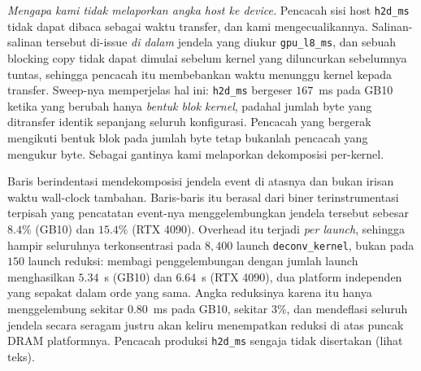 \documentclass[conference]{IEEEtran}
\begin{document}
\emph{Mengapa kami tidak melaporkan angka host ke device.} Pencacah sisi host \texttt{h2d\_ms} tidak dapat dibaca sebagai waktu transfer, dan kami mengecualikannya. Salinan-salinan tersebut di-issue \emph{di dalam} jendela yang diukur \texttt{gpu\_l8\_ms}, dan sebuah blocking copy tidak dapat dimulai sebelum kernel yang diluncurkan sebelumnya tuntas, sehingga pencacah itu membebankan waktu menunggu kernel kepada transfer. Sweep-nya memperjelas hal ini: \texttt{h2d\_ms} bergeser $167$~ms pada GB10 ketika yang berubah hanya \emph{bentuk blok kernel}, padahal jumlah byte yang ditransfer identik sepanjang seluruh konfigurasi. Pencacah yang bergerak mengikuti bentuk blok pada jumlah byte tetap bukanlah pencacah yang mengukur byte. Sebagai gantinya kami melaporkan dekomposisi per-kernel.

\begin{table}[htbp]
\caption{Rincian Profiling Layer~8, $32{\times}8\_256$, 150 Frame (ms, rerata $\pm$ SD atas 6 run)}
\label{tab:breakdown}
\centering
{}

\vspace{1mm}
\footnotesize{Baris berindentasi mendekomposisi jendela event di atasnya dan bukan irisan waktu wall-clock tambahan. Baris-baris itu berasal dari biner terinstrumentasi terpisah yang pencatatan event-nya menggelembungkan jendela tersebut sebesar $8.4\%$ (GB10) dan $15.4\%$ (RTX 4090). Overhead itu terjadi \emph{per launch}, sehingga hampir seluruhnya terkonsentrasi pada $8{,}400$ launch \texttt{deconv\_kernel}, bukan pada $150$ launch reduksi: membagi penggelembungan dengan jumlah launch menghasilkan $5.34$~\textmu s (GB10) dan $6.64$~\textmu s (RTX 4090), dua platform independen yang sepakat dalam orde yang sama. Angka reduksinya karena itu hanya menggelembung sekitar $0.80$~ms pada GB10, sekitar $3\%$, dan mendeflasi seluruh jendela secara seragam justru akan keliru menempatkan reduksi di atas puncak DRAM platformnya. Pencacah produksi \texttt{h2d\_ms} sengaja tidak disertakan (lihat teks).}
\end{table}
\end{document}
